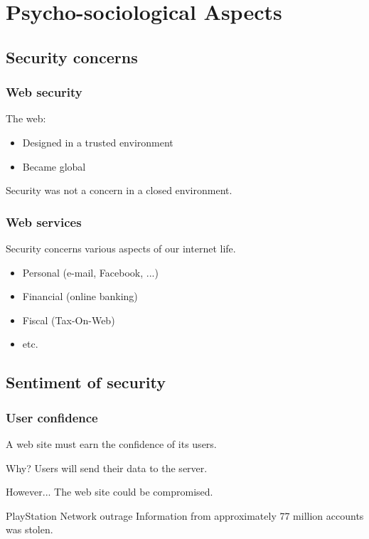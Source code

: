 \section{Psycho-sociological Aspects}

\begin{frame}
\sectionpage
\end{frame}

\subsection{Security concerns}

\begin{frame}
\frametitle{Web security}
The web:
\begin{itemize}
\item Designed in a trusted environment
\item Became global
\end{itemize}
Security was not a concern in a closed environment.
\end{frame}

\begin{frame}
\frametitle{Web services}
Security concerns various aspects of our internet life.
\begin{itemize}
\item Personal (e-mail, Facebook, ...)
\item Financial (online banking)
\item Fiscal (Tax-On-Web)
\item etc.
\end{itemize}
\end{frame}

\subsection{Sentiment of security}

\begin{frame}
\frametitle{User confidence}
A web site must earn the confidence of its users.
\begin{block}{Why?}
Users will send their data to the server.
\end{block}
\begin{block}{However...}
The web site could be compromised.
\end{block}
\begin{exampleblock}{PlayStation Network outrage}
Information from approximately 77 million accounts was stolen.
\end{exampleblock}
\end{frame}

